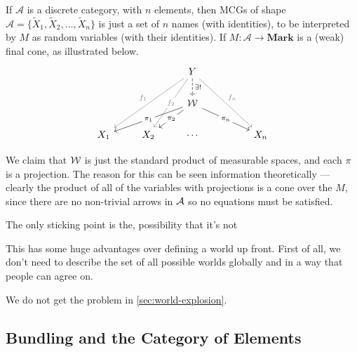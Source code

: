 \documentclass{article}
\begin{document}
	\begin{example}
		If $\mathcal A$ is a discrete category, with $n$ elements, then MCGs of shape $\mathcal A = \{\tilde X_1, \tilde X_2, \ldots, \tilde X_n\}$ is just a set of $n$ names (with identities), to be interpreted by $M$ as random variables (with their identities). If $M : \mathcal A \to \mathbf{Mark}$ is a (weak) final cone, as illustrated below.
		\[ \begin{tikzcd}
				&& Y  \ar[ddll, gray, "f_1"']\ar[ddl,gray, "f_2"description]\ar[ddrr,gray, "f_n"] \ar[d, dashed, "\exists!"]\\
				&& \mathcal W \ar[dll, "\pi_1"description]\ar[dl, "\pi_2"description]\ar[drr, "\pi_n"description] \\
				X_1 & X_2 & \cdots & & X_n
			\end{tikzcd} \]
			
		We claim that $\cal W$ is just the standard product of measurable spaces, and each $\pi$ is a projection. The reason for this can be seen information theoretically --- clearly the product of all of the variables with projections is a cone over the $M$, since there are no non-trivial arrows in $\cal A$ so no equations must be satisfied. %
		
		The only sticking point is the, possibility that it's not  %
	\end{example}

	This has some huge advantages over defining a world up front. First of all, we don't need to describe the set of all possible worlds globally and in a way that people can agree on. 
	
	We do not get the problem in \ref{sec:world-explosion}.
	
	
	\begin{example}
	\end{example}
	
	\begin{example}
		\todo{filtered limit}
	\end{example}

	\begin{conj}
	\end{conj}
	
	\subsection{Bundling and the Category of Elements}
\end{document}
